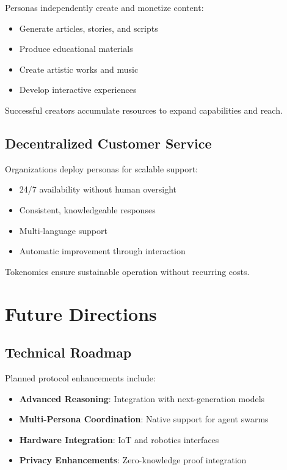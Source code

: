 \documentclass{article}
\begin{document}
Personas independently create and monetize content:
\begin{itemize}
    \item Generate articles, stories, and scripts
    \item Produce educational materials
    \item Create artistic works and music
    \item Develop interactive experiences
\end{itemize}

Successful creators accumulate resources to expand capabilities and reach.

\subsection{Decentralized Customer Service}

Organizations deploy personas for scalable support:
\begin{itemize}
    \item 24/7 availability without human oversight
    \item Consistent, knowledgeable responses
    \item Multi-language support
    \item Automatic improvement through interaction
\end{itemize}

Tokenomics ensure sustainable operation without recurring costs.

\section{Future Directions}

\subsection{Technical Roadmap}

Planned protocol enhancements include:

\begin{itemize}
    \item \textbf{Advanced Reasoning}: Integration with next-generation models
    \item \textbf{Multi-Persona Coordination}: Native support for agent swarms
    \item \textbf{Hardware Integration}: IoT and robotics interfaces
    \item \textbf{Privacy Enhancements}: Zero-knowledge proof integration
\end{itemize}
\end{document}
